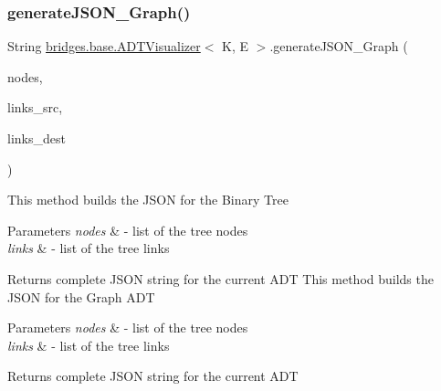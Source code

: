 \subsubsection{\texorpdfstring{generate\+J\+S\+O\+N\+\_\+\+Graph()}{generateJSON\_Graph()}}
{\footnotesize\ttfamily String \hyperlink{classbridges_1_1base_1_1_a_d_t_visualizer}{bridges.\+base.\+A\+D\+T\+Visualizer}$<$ K, E $>$.generate\+J\+S\+O\+N\+\_\+\+Graph (\begin{DoxyParamCaption}\item[{Linked\+List$<$ \hyperlink{classbridges_1_1base_1_1_element}{Element}$<$ E $>$$>$}]{nodes,  }\item[{Linked\+List$<$ \hyperlink{classbridges_1_1base_1_1_element}{Element}$<$ E $>$$>$}]{links\+\_\+src,  }\item[{Linked\+List$<$ \hyperlink{classbridges_1_1base_1_1_element}{Element}$<$ E $>$$>$}]{links\+\_\+dest }\end{DoxyParamCaption})}

This method builds the J\+S\+ON for the Binary Tree 
\begin{DoxyParams}{Parameters}
{\em nodes} & -\/ list of the tree nodes \\
\hline
{\em links} & -\/ list of the tree links \\
\hline
\end{DoxyParams}
\begin{DoxyReturn}{Returns}
complete J\+S\+ON string for the current A\+DT This method builds the J\+S\+ON for the Graph A\+DT 
\end{DoxyReturn}

\begin{DoxyParams}{Parameters}
{\em nodes} & -\/ list of the tree nodes \\
\hline
{\em links} & -\/ list of the tree links \\
\hline
\end{DoxyParams}
\begin{DoxyReturn}{Returns}
complete J\+S\+ON string for the current A\+DT 
\end{DoxyReturn}
\hypertarget{classbridges_1_1base_1_1_a_d_t_visualizer_adf2164b7f4b3befb8b2cb2904efd8c91}{}\label{classbridges_1_1base_1_1_a_d_t_visualizer_adf2164b7f4b3befb8b2cb2904efd8c91} 
